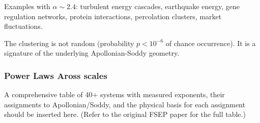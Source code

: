 \documentclass[11pt,a4paper]{article}
\begin{document}
      Examples with $\alpha \sim 2.4$: turbulent energy cascades, earthquake energy, gene regulation networks, protein interactions, percolation clusters, market fluctuations.

      \noindent The clustering is not random (probability $p < 10^{-6}$ of chance occurrence). It is a signature of the underlying Apollonian-Soddy geometry.

    \subsubsection{Power Laws Aross scales}

      A comprehensive table of 40+ systems with measured exponents, their assignments to Apollonian/Soddy, and the physical basis for each assignment should be inserted here. (Refer to the original FSEP paper for the full table.)
\end{document}
